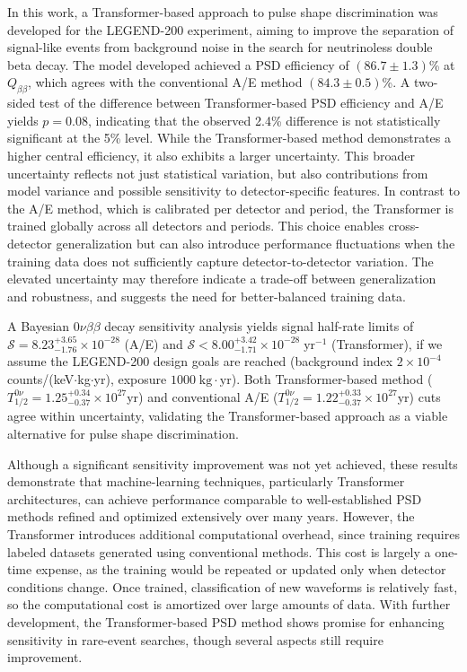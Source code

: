 In this work, a Transformer-based approach to pulse shape discrimination was developed for the LEGEND-200 experiment, aiming to improve the separation of signal-like events from background noise in the search for neutrinoless double beta decay.
The model developed achieved a PSD efficiency of $(86.7 \pm 1.3)$\% at $Q_{\beta \beta}$, which agrees with the conventional A/E method $(84.3 \pm 0.5)$\%. A two-sided test of the difference between Transformer-based PSD efficiency and A/E yields $p = 0.08$, indicating that the observed 2.4\% difference is not statistically significant at the 5\% level.
While the Transformer-based method demonstrates a higher central efficiency, it also exhibits a larger uncertainty. This broader uncertainty reflects not just statistical variation, but also contributions from model variance and possible sensitivity to detector-specific features. In contrast to the A/E method, which is calibrated per detector and period, the Transformer is trained globally across all detectors and periods. This choice enables cross-detector generalization but can also introduce performance fluctuations when the training data does not sufficiently capture detector-to-detector variation. The elevated uncertainty may therefore indicate a trade-off between generalization and robustness, and suggests the need for better-balanced training data. 

A Bayesian $0 \nu \beta \beta$ decay sensitivity analysis yields signal half-rate limits of $\mathcal{S} = 8.23^{+3.65}_{-1.76} \times 10^{-28}$ (A/E) and $\mathcal{S} < 8.00^{+3.42}_{-1.71} \times 10^{-28} \; \mathrm{yr}^{-1}$ (Transformer), if we assume the LEGEND-200 design goals are reached (background index $2 \times 10^{-4}$ counts/(keV$\cdot$kg$\cdot$yr), exposure $1000 \;\mathrm{kg \cdot yr}$). Both Transformer-based method ($T^{0 \nu}_{1/2} = 1.25^{+0.34}_{-0.37} \times 10^{27}$yr) and conventional A/E ($T^{0 \nu}_{1/2} = 1.22^{+0.33}_{-0.37} \times 10^{27}$yr) cuts agree within uncertainty, validating the Transformer-based approach as a viable alternative for pulse shape discrimination. 

Although a significant sensitivity improvement was not yet achieved, these results demonstrate that machine-learning techniques, particularly Transformer architectures, can achieve performance comparable to well-established PSD methods refined and optimized extensively over many years.
However, the Transformer introduces additional computational overhead, since training requires labeled datasets generated using conventional methods. This cost is largely a one-time expense, as the training would be repeated or updated only when detector conditions change. Once trained, classification of new waveforms is relatively fast, so the computational cost is amortized over large amounts of data. 
With further development, the Transformer-based PSD method shows promise for enhancing sensitivity in rare-event searches, though several aspects still require improvement.

